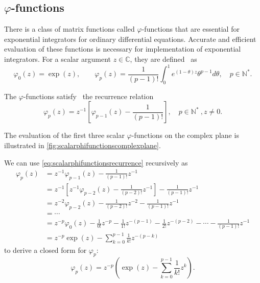 \subsection{\texorpdfstring{$\varphi$}{Phi}-functions}
There is a class of matrix functions called $\varphi$-functions that are essential
for exponential integrators for ordinary differential equations. Accurate and efficient
evaluation of these functions is necessary for implementation of exponential integrators.
For a scalar argument $z \in \mathbb{C}$, they are defined~\cite{higham2008functions} as
\begin{equation}
    \label{eq:scalarphifunctionsdefinition}
    \varphi_0(z) = \exp(z), \qquad
    \varphi_p(z) = \frac{1}{(p-1)!} \int_{0}^{1}{e^{(1 - \theta)z} \theta^{p-1} d\theta},
    \quad p \in \mathbb{N^*}.
\end{equation}

The $\varphi$-functions satisfy~\cite{higham2008functions} the recurrence relation
\begin{equation}
    \label{eq:scalarphifunctionsrecurrence}
    \varphi_p(z) = z^{-1} \left[ \varphi_{p-1}(z) - \frac{1}{(p-1)!} \right] ,
    \quad p \in \mathbb{N^*} \:, z \neq 0 .
\end{equation}

The evaluation of the first three scalar $\varphi$-functions on the complex plane
is illustrated in \autoref{fig:scalarphifunctionscomplexplane}.

We can use \eqref{eq:scalarphifunctionsrecurrence} recursively as
\begin{equation*}
    \begin{aligned}
        \varphi_p(z) & = z^{-1} \varphi_{p-1}(z) - \frac{1}{(p-1)!} z^{-1} \\
        & = z^{-1} \left[ z^{-1} \varphi_{p-2}(z) - \frac{1}{(p-2)!} z^{-1} \right] - \frac{1}{(p-1)!} z^{-1} \\
        & = z^{-2} \varphi_{p-2}(z) - \frac{1}{(p-2)!} z^{-2} - \frac{1}{(p-1)!} z^{-1} \\
        & = \cdots \\
        & = z^{-p} \varphi_{0}(z) - \frac{1}{0!} z^{-p} - \frac{1}{1!} z^{-(p-1)} - \frac{1}{2!} z^{-(p-2)} - \cdots - \frac{1}{(p-1)!} z^{-1} \\
        & = z^{-p} \exp(z) - \sum_{k=0}^{p-1}{\frac{1}{k!}z^{-(p-k)}}
        \end{aligned}
\end{equation*}
to derive a closed form for $\varphi_p$:
\begin{equation}
    \label{eq:scalarphifunctionsclosedform}
    \varphi_p(z) = z^{-p} \left( \exp(z) - \sum_{k=0}^{p-1}{\frac{1}{k!}z^{k}} \right).
\end{equation}

